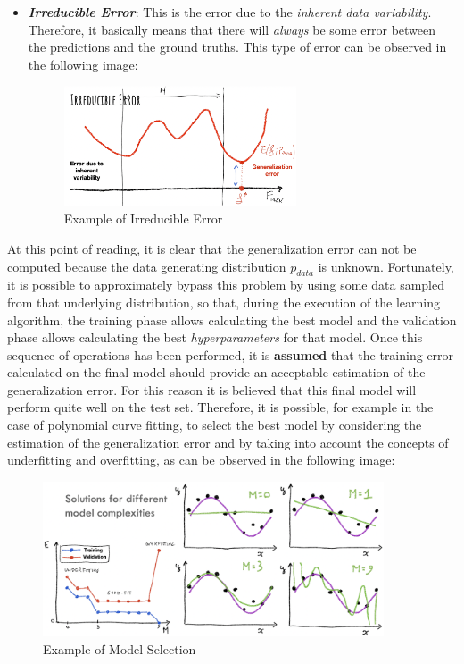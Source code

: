 \begin{itemize}
      \item \emph{\textbf{Irreducible Error}}: This is the error due to the
            \emph{inherent data variability}. Therefore, it basically means that there
            will \emph{always} be some error between the predictions and the ground
            truths. This type of error can be observed in the following image:

            \begin{figure}[h]
                  \centering
                  \includegraphics[width=0.65\textwidth]{../img/Irreducible_error}
                  \caption{Example of Irreducible Error}
            \end{figure}

\end{itemize}

At this point of reading, it is clear that the generalization error can not be computed
because the data generating distribution $p_{data}$ is unknown. Fortunately, it is
possible to approximately bypass this problem by using some data sampled from that
underlying distribution, so that, during the execution of the learning algorithm,
the training phase allows calculating the best model and the validation phase allows
calculating the best \emph{hyperparameters} for that model. Once this sequence of
operations has been performed, it is \textbf{assumed} that the training error
calculated on the final model should provide an acceptable estimation of the
generalization error. For this reason it is believed that this final model will perform
quite well on the test set. Therefore, it is possible, for example in the case of
polynomial curve fitting, to select the best model by considering the estimation of
the generalization error and by taking into account the concepts of underfitting
and overfitting, as can be observed in the following image:

\newpage

\begin{figure}[h]
      \centering
      \includegraphics[width=0.9\textwidth]{../img/Model_selection}
      \caption{Example of Model Selection}
\end{figure}

